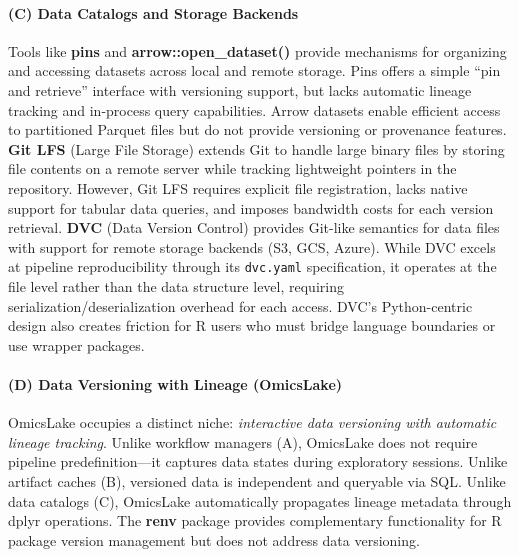 \documentclass[11pt,a4paper]{article}
\begin{document}
\paragraph{(C) Data Catalogs and Storage Backends}
Tools like \textbf{pins} \citep{pins2024} and \textbf{arrow::open\_dataset()} provide mechanisms for organizing and accessing datasets across local and remote storage. Pins offers a simple ``pin and retrieve'' interface with versioning support, but lacks automatic lineage tracking and in-process query capabilities. Arrow datasets enable efficient access to partitioned Parquet files but do not provide versioning or provenance features. \textbf{Git LFS} (Large File Storage) \citep{gitlfs2024} extends Git to handle large binary files by storing file contents on a remote server while tracking lightweight pointers in the repository. However, Git LFS requires explicit file registration, lacks native support for tabular data queries, and imposes bandwidth costs for each version retrieval. \textbf{DVC} (Data Version Control) \citep{dvc2020} provides Git-like semantics for data files with support for remote storage backends (S3, GCS, Azure). While DVC excels at pipeline reproducibility through its \texttt{dvc.yaml} specification, it operates at the file level rather than the data structure level, requiring serialization/deserialization overhead for each access. DVC's Python-centric design also creates friction for R users who must bridge language boundaries or use wrapper packages.

\paragraph{(D) Data Versioning with Lineage (OmicsLake)}
OmicsLake occupies a distinct niche: \emph{interactive data versioning with automatic lineage tracking}. Unlike workflow managers (A), OmicsLake does not require pipeline predefinition---it captures data states during exploratory sessions. Unlike artifact caches (B), versioned data is independent and queryable via SQL. Unlike data catalogs (C), OmicsLake automatically propagates lineage metadata through dplyr operations. The \textbf{renv} package \citep{ushey2024renv} provides complementary functionality for R package version management but does not address data versioning.
\end{document}
